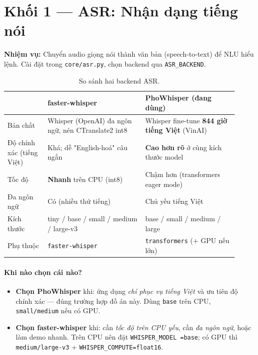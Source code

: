 \documentclass[12pt,a4paper]{article}
\newcommand{\role}[1]{\par\smallskip\noindent\textbf{\textcolor{hdr}{Nhiệm vụ:}} #1\par\smallskip}
\begin{document}
\section{Khối 1 --- ASR: Nhận dạng tiếng nói}
\role{Chuyển audio giọng nói thành văn bản (speech-to-text) để NLU hiểu lệnh.
Cài đặt trong \texttt{core/asr.py}, chọn backend qua \texttt{ASR\_BACKEND}.}

\begin{table}[H]
\centering
\caption{So sánh hai backend ASR.}
\small
\begin{tabular}{p{0.16\linewidth}p{0.39\linewidth}p{0.37\linewidth}}
\toprule
& \textbf{faster-whisper} & \textbf{PhoWhisper} (đang dùng) \\
\midrule
Bản chất & Whisper (OpenAI) đa ngôn ngữ, nén CTranslate2 int8 & Whisper fine-tune
\textbf{844 giờ tiếng Việt} (VinAI) \\
Độ chính xác (tiếng Việt) & Khá; dễ "English-hoá" câu ngắn & \textbf{Cao hơn rõ}
ở cùng kích thước model \\
Tốc độ & \textbf{Nhanh} trên CPU (int8) & Chậm hơn (transformers eager mode) \\
Đa ngôn ngữ & Có (nhiều thứ tiếng) & Chủ yếu tiếng Việt \\
Kích thước & tiny / base / small / medium / large-v3 & base / small / medium / large \\
Phụ thuộc & \texttt{faster-whisper} & \texttt{transformers} (+ GPU nếu lớn) \\
\bottomrule
\end{tabular}
\end{table}

\paragraph{Khi nào chọn cái nào?}
\begin{itemize}
  \item \textbf{Chọn PhoWhisper} khi: ứng dụng \emph{chỉ phục vụ tiếng Việt} và
  ưu tiên độ chính xác --- đúng trường hợp đồ án này. Dùng \texttt{base} trên CPU,
  \texttt{small/medium} nếu có GPU.
  \item \textbf{Chọn faster-whisper} khi: cần \emph{tốc độ trên CPU yếu}, cần
  \emph{đa ngôn ngữ}, hoặc làm demo nhanh. Trên CPU nên đặt \texttt{WHISPER\_MODEL
  =base}; có GPU thì \texttt{medium/large-v3} + \texttt{WHISPER\_COMPUTE=float16}.
\end{itemize}
\end{document}
